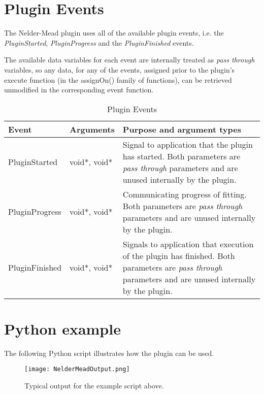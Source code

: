 \section{Plugin Events}
The Nelder-Mead plugin uses all of the available plugin events, i.e. the \emph{PluginStarted}, \emph{PluginProgress} and the \emph{PluginFinished} events.

The available data variables for each event are internally treated as \emph{pass through} variables, so any data, for any of the events, assigned prior to
the plugin's execute function (in the assignOn() family of functions), can be retrieved unmodified in the corresponding event function.

\begin{table}[ht]
\centering %
\begin{tabular}{l l p{9cm}}

Event & Arguments & Purpose and argument types \\ [0.5ex] %
\hline %
PluginStarted  	& 	void*, void*  & Signal to application that the plugin has started. Both parameters are \emph{pass through} parameters and are unused internally by the plugin.\\[0.5ex]
PluginProgress	& 	void*, void*  & Communicating progress of fitting. Both parameters are \emph{pass through} parameters and are unused internally by the plugin. \\[0.5ex]
PluginFinished	& 	void*, void*  & Signals to application that execution of the plugin has finished. Both parameters are \emph{pass through} parameters and are unused internally by the plugin.\\

\hline %
\end{tabular}
\caption{Plugin Events}
\label{table:nmPluginEvents}
\end{table}

\section{Python example}
The following Python script illustrates how the plugin can be used.

\begin{singlespace}

\end{singlespace}

\begin{figure}[ht]
\centering
\texttt{[image: NelderMeadOutput.png]}
\caption{Typical output for the example script above.}
\label{fig:nmFig}
\end{figure}







